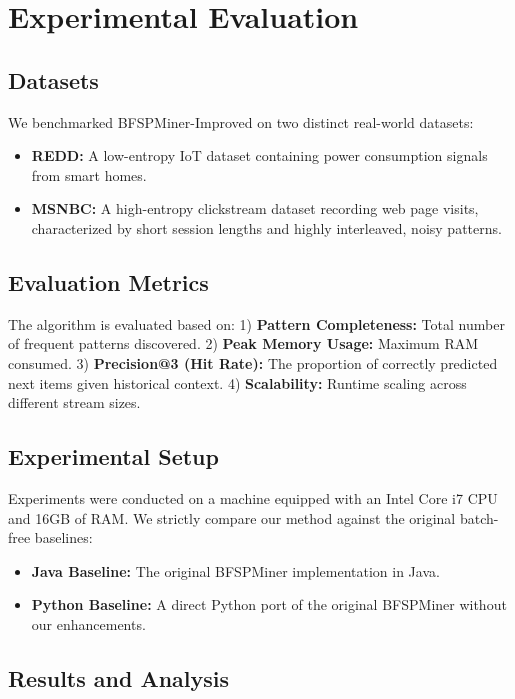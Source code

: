 \documentclass[conference]{IEEEtran}
\begin{document}
\section{Experimental Evaluation}
\label{sec:experiments}

\subsection{Datasets}
We benchmarked BFSPMiner-Improved on two distinct real-world datasets:
\begin{itemize}
    \item \textbf{REDD:} A low-entropy IoT dataset containing power consumption signals from smart homes.
    \item \textbf{MSNBC:} A high-entropy clickstream dataset recording web page visits, characterized by short session lengths and highly interleaved, noisy patterns.
\end{itemize}

\subsection{Evaluation Metrics}
The algorithm is evaluated based on:
1) \textbf{Pattern Completeness:} Total number of frequent patterns discovered.
2) \textbf{Peak Memory Usage:} Maximum RAM consumed.
3) \textbf{Precision@3 (Hit Rate):} The proportion of correctly predicted next items given historical context.
4) \textbf{Scalability:} Runtime scaling across different stream sizes.

\subsection{Experimental Setup}
Experiments were conducted on a machine equipped with an Intel Core i7 CPU and 16GB of RAM. We strictly compare our method against the original batch-free baselines:
\begin{itemize}
    \item \textbf{Java Baseline:} The original BFSPMiner implementation in Java.
    \item \textbf{Python Baseline:} A direct Python port of the original BFSPMiner without our enhancements.
\end{itemize}

\subsection{Results and Analysis}
\end{document}
